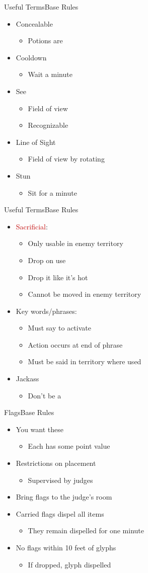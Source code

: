 \documentclass[17pt]{beamer}
\newcommand{\R}{\textcolor[HTML]{C00000}}
\newcommand{\subitem}[1]{\begin{itemize} \item #1 \end{itemize}}
\begin{document}
\begin{frame}{Useful Terms}{Base Rules}
  \begin{itemize}
  \item Concealable
    \subitem{Potions are}
  \item Cooldown
    \subitem{Wait a minute}
  \item See
    \begin{itemize}
    \item Field of view
    \item Recognizable
    \end{itemize}
  \item Line of Sight
    \subitem{Field of view by rotating}
  \item Stun
    \subitem{Sit for a minute}
  \end{itemize}
\end{frame}

\begin{frame}{Useful Terms}{Base Rules}
  \begin{itemize}
  \item \R{Sacrificial}:
    \begin{itemize}
    \item Only usable in enemy territory
    \item Drop on use
    \item<2> Drop it like it's hot
    \item Cannot be moved in enemy territory
    \end{itemize}
  \item Key words/phrases:
    \begin{itemize}
    \item Must say to activate
    \item Action occurs at end of phrase
    \item Must be said in territory where used
    \end{itemize}
  \item Jackass
    \subitem{Don't be a}
  \end{itemize}
\end{frame}


\begin{frame}{Flags}{Base Rules}
  \begin{itemize}
  \item You want these
    \subitem{Each has some point value}
  \item Restrictions on placement
    \subitem{Supervised by judges}
  \item Bring flags to the judge's room
  \item Carried flags dispel all items
    \subitem{They remain dispelled for one minute}
  \item No flags within 10 feet of glyphs
    \subitem{If dropped, glyph dispelled}
  \end{itemize}
\end{frame}
\end{document}
